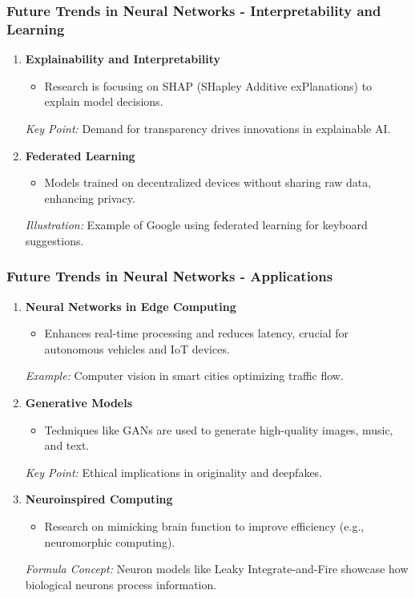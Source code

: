 \documentclass[aspectratio=169]{beamer}
\begin{document}
\begin{frame}[fragile]
  \frametitle{Future Trends in Neural Networks - Interpretability and Learning}
  \begin{enumerate}[resume]
    \item \textbf{Explainability and Interpretability}
      \begin{itemize}
        \item Research is focusing on SHAP (SHapley Additive exPlanations) to explain model decisions.
      \end{itemize}
      \textit{Key Point:} Demand for transparency drives innovations in explainable AI.

    \item \textbf{Federated Learning}
      \begin{itemize}
        \item Models trained on decentralized devices without sharing raw data, enhancing privacy.
      \end{itemize}
      \textit{Illustration:} Example of Google using federated learning for keyboard suggestions.
  \end{enumerate}
\end{frame}

\begin{frame}[fragile]
  \frametitle{Future Trends in Neural Networks - Applications}
  \begin{enumerate}[resume]
    \item \textbf{Neural Networks in Edge Computing}
      \begin{itemize}
        \item Enhances real-time processing and reduces latency, crucial for autonomous vehicles and IoT devices.
      \end{itemize}
      \textit{Example:} Computer vision in smart cities optimizing traffic flow.

    \item \textbf{Generative Models}
      \begin{itemize}
        \item Techniques like GANs are used to generate high-quality images, music, and text.
      \end{itemize}
      \textit{Key Point:} Ethical implications in originality and deepfakes.

    \item \textbf{Neuroinspired Computing}
      \begin{itemize}
        \item Research on mimicking brain function to improve efficiency (e.g., neuromorphic computing).
      \end{itemize}
      \textit{Formula Concept:} Neuron models like Leaky Integrate-and-Fire showcase how biological neurons process information.
  \end{enumerate}
\end{frame}
\end{document}
